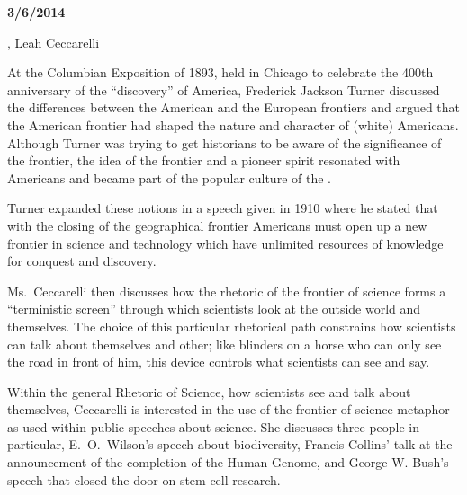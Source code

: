 
{\bf 3/6/2014}

, Leah Ceccarelli \cite{Ceccarelli2013}

At the Columbian Exposition of 1893, held in Chicago to celebrate the
400th anniversary of the ``discovery'' of America, Frederick Jackson
Turner discussed the differences between the American and the European
frontiers and argued that the American frontier had shaped the nature
and character of (white) Americans. Although Turner was trying to get
historians to be aware of the significance of the frontier, the idea of
the frontier and a pioneer spirit resonated with Americans and became part
of the popular culture of the .

Turner expanded these notions in a speech given in 1910 where he
stated that with the closing of the geographical frontier Americans
must open up a new frontier in science and technology which have
unlimited resources of knowledge for conquest and discovery.

Ms.\ Ceccarelli then discusses how the rhetoric of the frontier of
science forms a ``terministic screen'' through which scientists look
at the outside world and themselves.  The choice of this particular
rhetorical path constrains how scientists can talk about themselves
and other; like blinders on a horse who can only see the road in front
of him, this device controls what scientists can see and say.

Within the general Rhetoric of Science, how scientists see and talk
about themselves, Ceccarelli is interested in the use of the frontier
of science metaphor as used within public speeches about science. She
discusses three people in particular, E.\ O.\ Wilson's speech about
biodiversity, Francis Collins' talk at the announcement of the completion
of the Human Genome, and George W. Bush's speech that closed the door
on stem cell research.

